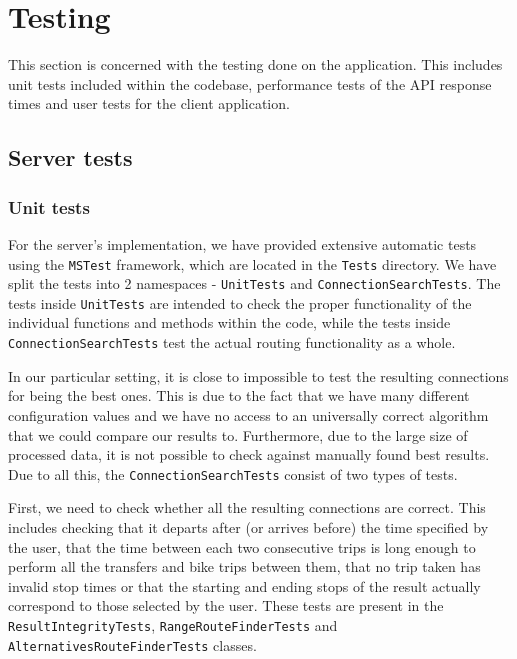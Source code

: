 \chapter{Testing}

This section is concerned with the testing done on the application. This includes unit tests included within the codebase, performance tests of the API response times and user tests for the client application.

\section{Server tests}

\subsection{Unit tests}

For the server's implementation, we have provided extensive automatic tests using the \texttt{MSTest} framework, which are located in the \texttt{Tests} directory. We have split the tests into 2 namespaces - \texttt{UnitTests} and \texttt{ConnectionSearchTests}. The tests inside \texttt{UnitTests} are intended to check the proper functionality of the individual functions and methods within the code, while the tests inside \texttt{ConnectionSearchTests} test the actual routing functionality as a whole.

In our particular setting, it is close to impossible to test the resulting connections for being the best ones. This is due to the fact that we have many different configuration values and we have no access to an universally correct algorithm that we could compare our results to. Furthermore, due to the large size of processed data, it is not possible to check against manually found best results. Due to all this, the \texttt{ConnectionSearchTests} consist of two types of tests. 

First, we need to check whether all the resulting connections are correct. This includes checking that it departs after (or arrives before) the time specified by the user, that the time between each two consecutive trips is long enough to perform all the transfers and bike trips between them, that no trip taken has invalid stop times or that the starting and ending stops of the result actually correspond to those selected by the user. These tests are present in the \texttt{ResultIntegrityTests}, \texttt{RangeRouteFinderTests} and \texttt{AlternativesRouteFinderTests} classes.

